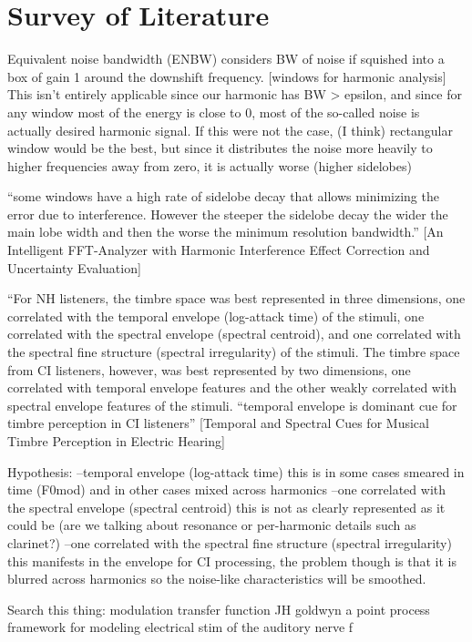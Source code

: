 \documentclass [11pt, proquest] {uwthesis}[2015/03/03]
\begin{document}
\section{Survey of Literature}

Equivalent noise bandwidth (ENBW) considers BW of noise if squished into a box of gain 1 around the downshift frequency.  [windows for harmonic analysis] This isn't entirely applicable since our harmonic has BW > epsilon, and since for any window most of the energy is close to 0, most of the so-called noise is actually desired harmonic signal.  If this were not the case, (I think) rectangular window would be the best, but since it distributes the noise more heavily to higher frequencies away from zero, it is actually worse (higher sidelobes)

``some windows have a high rate of sidelobe decay that allows minimizing the error due to interference. However the steeper the sidelobe decay
the wider the main lobe width and then the worse the minimum resolution bandwidth.'' [An Intelligent FFT-Analyzer with Harmonic Interference Effect Correction and Uncertainty Evaluation]

``For NH listeners, the timbre space was best represented in three dimensions, one correlated with the temporal envelope (log-attack time) of the stimuli, one correlated with the spectral envelope (spectral centroid), and one correlated with the spectral fine structure (spectral irregularity) of the stimuli. The timbre space from CI listeners, however, was best represented by two dimensions, one correlated with temporal envelope features and the other weakly correlated with spectral envelope features of the stimuli. 
``temporal envelope is dominant cue for timbre perception in CI listeners''
[Temporal and Spectral Cues for Musical Timbre
Perception in Electric Hearing]

Hypothesis:
--temporal envelope (log-attack time)
this is in some cases smeared in time (F0mod) and in other cases mixed across harmonics
--one correlated with the spectral envelope (spectral centroid)
this is not as clearly represented as it could be (are we talking about resonance or per-harmonic details such as clarinet?)
--one correlated with the spectral fine structure (spectral irregularity)
this manifests in the envelope for CI processing, the problem though is that it is blurred across harmonics so the noise-like characteristics will be smoothed.

Search this thing:
modulation transfer function
JH goldwyn
a point process framework for modeling electrical stim of the auditory nerve
f
\end{document}

